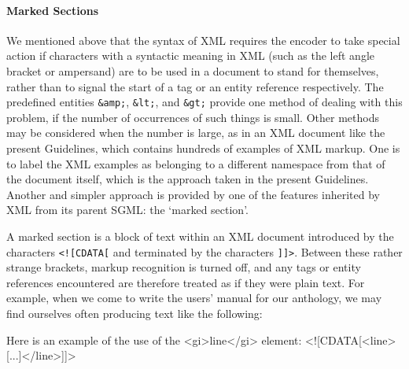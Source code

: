 \paragraph[{Marked Sections}]{Marked Sections}\label{SG-ms}\par
We mentioned above that the syntax of XML requires the encoder to take special action if characters with a syntactic meaning in XML (such as the left angle bracket or ampersand) are to be used in a document to stand for themselves, rather than to signal the start of a tag or an entity reference respectively. The predefined entities \texttt{\&amp;}, \texttt{\&lt;}, and \texttt{\&gt;} provide one method of dealing with this problem, if the number of occurrences of such things is small. Other methods may be considered when the number is large, as in an XML document like the present Guidelines, which contains hundreds of examples of XML markup. One is to label the XML examples as belonging to a different namespace from that of the document itself, which is the approach taken in the present Guidelines. Another and simpler approach is provided by one of the features inherited by XML from its parent SGML: the ‘marked section’.\par
A marked section is a block of text within an XML document introduced by the characters \texttt{<![CDATA[} and terminated by the characters \texttt{]]>}. Between these rather strange brackets, markup recognition is turned off, and any tags or entity references encountered are therefore treated as if they were plain text. For example, when we come to write the users' manual for our anthology, we may find ourselves often producing text like the following: \par\hfill\bgroup\exampleFont\vskip 10pt\begin{shaded}
\obeyspaces Here is an example of the use of the <gi>line</gi> element:\newline
<![CDATA[<line>[...]</line>]]>\end{shaded}
\par\egroup 

